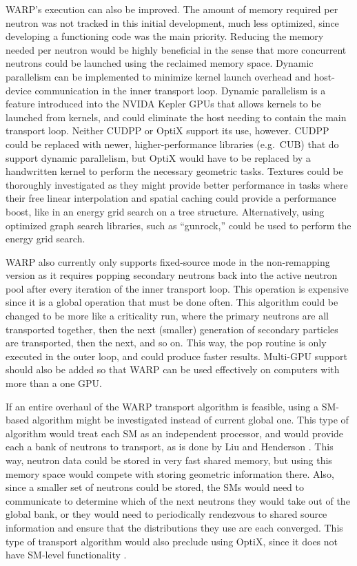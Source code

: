 WARP's execution can also be improved.  The amount of memory required per neutron was not tracked in this initial development, much less optimized, since developing a functioning code was the main priority.  Reducing the memory needed per neutron would be highly beneficial in the sense that more concurrent neutrons could be launched using the reclaimed memory space.  Dynamic parallelism can be implemented to minimize kernel launch overhead and host-device communication in the inner transport loop.  Dynamic parallelism is a feature introduced into the NVIDA Kepler GPUs that allows kernels to be launched from kernels, and could eliminate the host needing to contain the main transport loop.  Neither CUDPP or OptiX support its use, however.  CUDPP could be replaced with newer, higher-performance libraries (e.g.\ CUB) that do support dynamic parallelism, but OptiX would have to be replaced by a handwritten kernel to perform the necessary geometric tasks.  Textures could be thoroughly investigated as they might provide better performance in tasks where their free linear interpolation and spatial caching could provide a performance boost, like in an energy grid search on a tree structure.   Alternatively, using optimized graph search libraries, such as ``gunrock,'' could be used to perform the energy grid search.

WARP also currently only supports fixed-source mode in the non-remapping version as it requires popping secondary neutrons back into the active neutron pool after every iteration of the inner transport loop.  This operation is expensive since it is a global operation that must be done often.  This algorithm could be changed to be more like a criticality run, where the primary neutrons are all transported together, then the next (smaller) generation of secondary particles are transported, then the next, and so on.  This way, the pop routine is only executed in the outer loop, and could produce faster results.  Multi-GPU support should also be added so that WARP can be used effectively on computers with more than a one GPU.

If an entire overhaul of the WARP transport algorithm is feasible, using a SM-based algorithm might be investigated instead of current global one.  This type of algorithm would treat each SM as an independent processor, and would provide each a bank of neutrons to transport, as is done by Liu and Henderson \cite{tianyu,henderson}.   This way, neutron data could be stored in very fast shared memory, but using this memory space would compete with storing geometric information there.  Also, since a smaller set of neutrons could be stored, the SMs would need to communicate to determine which of the next neutrons they would take out of the global bank, or they would need to periodically rendezvous to shared source information and ensure that the distributions they use are each converged.  This type of transport algorithm would also preclude using OptiX, since it does not have SM-level functionality \cite{optix}.

